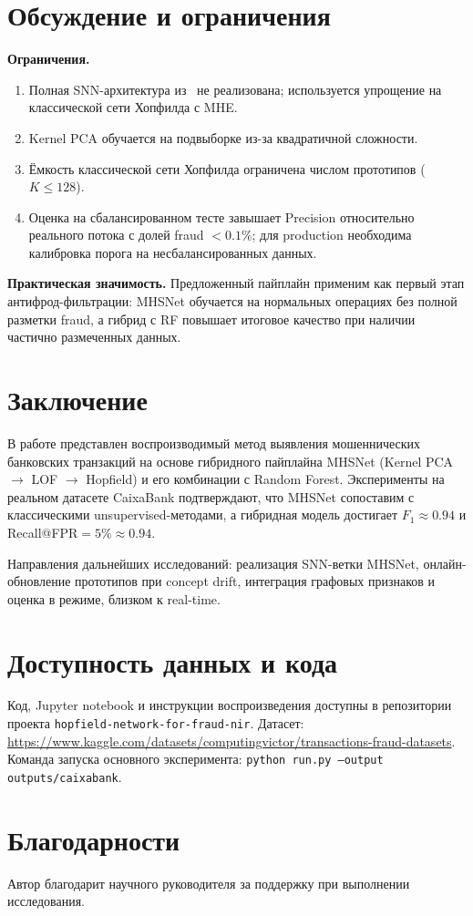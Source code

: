 \documentclass[12pt,a4paper]{article}
\begin{document}
\section{Обсуждение и ограничения}
\label{sec:discussion}

\textbf{Ограничения.}
\begin{enumerate}
  \item Полная SNN-архитектура из~\cite{zhao2025mhsnet} не реализована; используется упрощение
        на классической сети Хопфилда с MHE.
  \item Kernel PCA обучается на подвыборке из-за квадратичной сложности.
  \item Ёмкость классической сети Хопфилда ограничена числом прототипов ($K \le 128$).
  \item Оценка на сбалансированном тесте завышает Precision относительно реального потока
        с долей fraud $<0.1\%$; для production необходима калибровка порога на несбалансированных данных.
\end{enumerate}

\textbf{Практическая значимость.}
Предложенный пайплайн применим как первый этап антифрод-фильтрации: MHSNet обучается на нормальных
операциях без полной разметки fraud, а гибрид с RF повышает итоговое качество при наличии
частично размеченных данных.

\section{Заключение}
\label{sec:conclusion}

В работе представлен воспроизводимый метод выявления мошеннических банковских транзакций
на основе гибридного пайплайна MHSNet (Kernel PCA $\rightarrow$ LOF $\rightarrow$ Hopfield)
и его комбинации с Random Forest. Эксперименты на реальном датасете CaixaBank подтверждают,
что MHSNet сопоставим с классическими unsupervised-методами, а гибридная модель достигает
$F_1 \approx 0.94$ и Recall@FPR$=5\% \approx 0.94$.

Направления дальнейших исследований: реализация SNN-ветки MHSNet, онлайн-обновление прототипов
при concept drift, интеграция графовых признаков и оценка в режиме, близком к real-time.

\section*{Доступность данных и кода}

Код, Jupyter notebook и инструкции воспроизведения доступны в репозитории проекта
\texttt{hopfield-network-for-fraud-nir}.
Датасет: \url{https://www.kaggle.com/datasets/computingvictor/transactions-fraud-datasets}.
Команда запуска основного эксперимента:
\texttt{python run.py --output outputs/caixabank}.

\section*{Благодарности}

Автор благодарит научного руководителя за поддержку при выполнении исследования.



\end{document}
